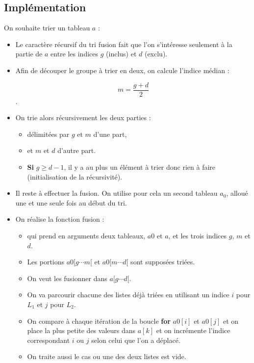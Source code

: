 \subsection{Implémentation}


On souhaite trier un tableau $a$ :
\begin{itemize}
\item Le caractère récursif du tri fusion fait que l'on s'intéresse seulement à la partie de $a$ entre les indices $g$ (inclus) et $d$ (exclu).
\item Afin de découper le groupe à trier en deux, on calcule l'indice médian :

$$m = \frac{g+d}{2}$$ . 

\item On trie alors récursivement les deux parties :
\begin{itemize}
\item délimitées par $g$ et $m$ d'une part,
\item et $m$ et $d$ d'autre part.
\item \textbf{Si} \textbf{$g\geq d-1$}, il y a au plus un élément à trier donc rien à faire (initialisation de la récursivité).
\end{itemize}


%		


\item Il reste à effectuer la fusion. On utilise pour cela un second tableau $a_0$, alloué une et une seule fois au
début du tri.
\item On réalise la fonction fusion :
\begin{itemize}
\item qui prend en arguments deux tableaux, $a0$ et $a$, et les trois indices $g$, $m$ et $d$. 
\item Les portions $a0[g \cdots  m[$ et $a0[m \cdots d[$ sont supposées triées.
\item On veut les fusionner dans $a[g\cdots d[$. 
\item On va parcourir chacune des listes déjà triées en utilisant un indice $i$ pour $L_1$ et $j$ pour $L_2$.
\item On compare à chaque itération de la boucle \textbf{for} $a0[i]$ et $a0[j]$ et on place la plus petite des valeurs dans $a[k]$ et on incrémente l'indice correspondant $i$ ou $j$ selon celui que l'on a déplacé.
\item On traite aussi le cas ou une des deux listes est vide.
\end{itemize}


%		


\end{itemize}
%


